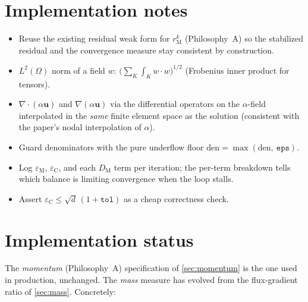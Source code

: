 \documentclass[11pt]{article}
\newcommand{\bu}{\boldsymbol{u}}
\newcommand{\grad}{\nabla}
\newcommand{\divg}{\nabla\!\cdot\!}
\newcommand{\rM}{r_{\mathrm M}}
\newcommand{\DM}{D_{\mathrm M}}
\newcommand{\epsM}{\varepsilon_{\mathrm M}}
\newcommand{\epsC}{\varepsilon_{\mathrm C}}
\theoremstyle{plain}
\theoremstyle{remark}
\begin{document}
\section{Implementation notes}\label{sec:impl}
\begin{itemize}
  \item Reuse the existing residual weak form for $\rM^k$ (Philosophy~A) so the
    stabilized residual and the convergence measure stay consistent by
    construction.
  \item $L^2(\Omega)$ norm of a field $w$: $\big(\sum_K\int_K w\!\cdot\!w\big)^{1/2}$
    (Frobenius inner product for tensors).
  \item $\divg(\alpha\bu)$ and $\grad(\alpha\bu)$ via the differential operators
    on the $\alpha$-field interpolated in the \emph{same} finite element space as
    the solution (consistent with the paper's nodal interpolation of $\alpha$).
  \item Guard denominators with the pure underflow floor
    $\text{den}=\max(\text{den},\ \texttt{eps})$.
  \item Log $\epsM$, $\epsC$, and each $\DM$ term per iteration; the per-term
    breakdown tells which balance is limiting convergence when the loop stalls.
  \item Assert $\epsC\le\sqrt{d}\,(1+\texttt{tol})$ as a cheap correctness check.
\end{itemize}

\section{Implementation status}\label{sec:status}
The \emph{momentum} (Philosophy~A) specification of \cref{sec:momentum} is the
one used in production, unchanged. The \emph{mass} measure has evolved from the
flux-gradient ratio of \cref{sec:mass}. Concretely:
\end{document}
